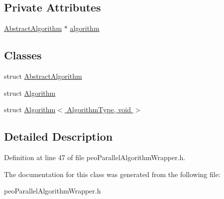 \subsection*{Private Attributes}
\begin{CompactItemize}
\item 
\hypertarget{classpeoParallelAlgorithmWrapper_99f10723f15c63c4822dd6431b9d6d7d}{
\hyperlink{structpeoParallelAlgorithmWrapper_1_1AbstractAlgorithm}{Abstract\-Algorithm} $\ast$ \hyperlink{classpeoParallelAlgorithmWrapper_99f10723f15c63c4822dd6431b9d6d7d}{algorithm}}
\label{classpeoParallelAlgorithmWrapper_99f10723f15c63c4822dd6431b9d6d7d}

\end{CompactItemize}
\subsection*{Classes}
\begin{CompactItemize}
\item 
struct \hyperlink{structpeoParallelAlgorithmWrapper_1_1AbstractAlgorithm}{Abstract\-Algorithm}
\item 
struct \hyperlink{structpeoParallelAlgorithmWrapper_1_1Algorithm}{Algorithm}
\item 
struct \hyperlink{structpeoParallelAlgorithmWrapper_1_1Algorithm_3_01AlgorithmType_00_01void_01_4}{Algorithm$<$ Algorithm\-Type, void $>$}
\end{CompactItemize}


\subsection{Detailed Description}




Definition at line 47 of file peo\-Parallel\-Algorithm\-Wrapper.h.

The documentation for this class was generated from the following file:\begin{CompactItemize}
\item 
peo\-Parallel\-Algorithm\-Wrapper.h\end{CompactItemize}
